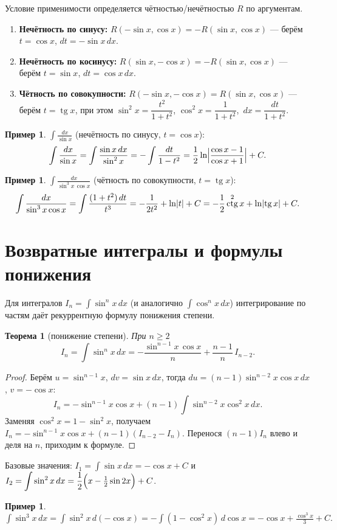 \documentclass[11pt,a4paper]{article}
\theoremstyle{definition}
\newtheorem{example}[definition]{Пример}
\theoremstyle{plain}
\newtheorem{theorem}[definition]{Теорема}
\DeclareMathOperator{\tg}{tg}
\DeclareMathOperator{\ctg}{ctg}
\newcommand{\dx}{\,dx}
\renewcommand{\ge}{\geqslant}
\DeclarePairedDelimiter{\abs}{\lvert}{\rvert}
\begin{document}
Условие применимости определяется чётностью/нечётностью $R$ по аргументам.
\begin{enumerate}[label=\arabic*),leftmargin=*]
  \item \textbf{Нечётность по синусу:} $R(-\sin x,\cos x)=-R(\sin x,\cos x)$ — берём $t=\cos x$,
        $dt=-\sin x\dx$.
  \item \textbf{Нечётность по косинусу:} $R(\sin x,-\cos x)=-R(\sin x,\cos x)$ — берём $t=\sin x$,
        $dt=\cos x\dx$.
  \item \textbf{Чётность по совокупности:} $R(-\sin x,-\cos x)=R(\sin x,\cos x)$ — берём $t=\tg x$,
        при этом $\sin^2 x=\dfrac{t^2}{1+t^2}$, $\cos^2 x=\dfrac{1}{1+t^2}$, $\dx=\dfrac{dt}{1+t^2}$.
\end{enumerate}

\begin{example}
$\displaystyle\int\frac{dx}{\sin x}$ (нечётность по синусу, $t=\cos x$):
\[
  \int\frac{dx}{\sin x}=\int\frac{\sin x\dx}{\sin^2 x}=-\int\frac{dt}{1-t^2}
   =\frac12\ln\abs[\Big]{\frac{\cos x-1}{\cos x+1}}+C .
\]
\end{example}

\begin{example}
$\displaystyle\int\frac{dx}{\sin^3 x\,\cos x}$ (чётность по совокупности, $t=\tg x$):
\[
  \int\frac{dx}{\sin^3 x\cos x}=\int\frac{(1+t^2)\,dt}{t^3}
   =-\frac{1}{2t^2}+\ln\abs{t}+C
   =-\frac12\ctg^2 x+\ln\abs{\tg x}+C .
\]
\end{example}

\section{Возвратные интегралы и формулы понижения}

Для интегралов $\displaystyle I_n=\int\sin^n x\dx$ (и аналогично $\int\cos^n x\dx$) интегрирование
по частям даёт рекуррентную формулу понижения степени.

\begin{theorem}[понижение степени]
При $n\ge2$
\[
  I_n=\int\sin^n x\dx=-\frac{\sin^{n-1}x\,\cos x}{n}+\frac{n-1}{n}\,I_{n-2}.
\]
\end{theorem}

\begin{proof}
Берём $u=\sin^{n-1}x$, $dv=\sin x\dx$, тогда $du=(n-1)\sin^{n-2}x\cos x\dx$, $v=-\cos x$:
\[
  I_n=-\sin^{n-1}x\cos x+(n-1)\int\sin^{n-2}x\cos^2 x\dx .
\]
Заменяя $\cos^2 x=1-\sin^2 x$, получаем
$I_n=-\sin^{n-1}x\cos x+(n-1)(I_{n-2}-I_n)$. Перенося $(n-1)I_n$ влево и деля на $n$, приходим к
формуле.
\end{proof}

\noindent Базовые значения: $I_1=\displaystyle\int\sin x\dx=-\cos x+C$ и
$I_2=\displaystyle\int\sin^2 x\dx=\frac12\Bigl(x-\tfrac12\sin 2x\Bigr)+C$.

\begin{example}
$\displaystyle\int\sin^3 x\dx=\int\sin^2 x\,d(-\cos x)=-\int(1-\cos^2 x)\,d\cos x
 =-\cos x+\frac{\cos^3 x}{3}+C.$
\end{example}
\end{document}
